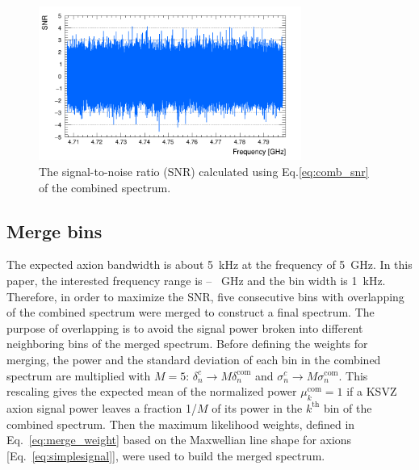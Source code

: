 \begin{figure}[hbt!]
    \centering
    \includegraphics[width=8.6cm]{figures/SNR_CombSpectrum_AxionRun_AllSteps_Rescan_SG4_W201_LqWeight.png}
    \caption{The signal-to-noise ratio (SNR) calculated using 
Eq.\eqref{eq:comb_snr} of the combined spectrum. }
    \label{fig:SNR_comb}
\end{figure}



\subsection{Merge bins}
\label{sec:merge}

The expected axion bandwidth is about 5~kHz at the frequency of 5~GHz. In 
this paper, the interested frequency range is \flo -- \fhi~GHz and the bin 
width is 1~kHz. Therefore, in order to maximize the SNR, five consecutive 
bins with overlapping of the combined spectrum were merged to construct a 
final spectrum.
The purpose of overlapping is to avoid the signal power broken into different 
neighboring bins of the merged spectrum. Before defining the weights for 
merging, 
the power and the standard deviation of each bin in the combined spectrum are 
multiplied with $M=5$: $\delta^{c}_n \rightarrow M\delta^\text{com}_n$ and 
$\sigma^{c}_n \rightarrow M \sigma^\text{com}_n$. This rescaling gives the 
expected mean of the normalized power $\mu^\text{com}_k = 1$ if a KSVZ axion 
signal power leaves a fraction 1/$M$ of its power in the $k^\text{th}$ 
bin of the combined spectrum.
Then the maximum likelihood weights, defined in Eq.~\eqref{eq:merge_weight} based on the Maxwellian line shape for axions [Eq.~\eqref{eq:simplesignal}], 
were used to build the merged spectrum. 



